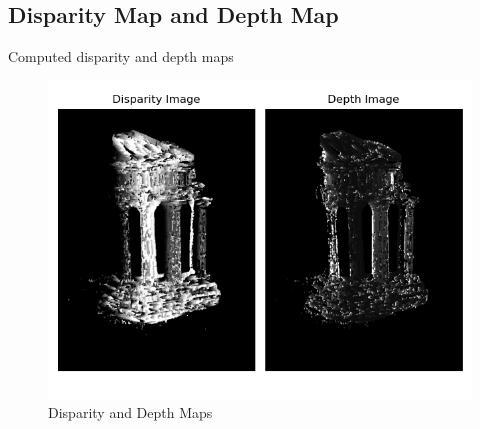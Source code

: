 \subsection{Disparity Map and Depth Map}

\step
Computed disparity and depth maps

\begin{figure}[H]
  \centering
  \includegraphics[width=\textwidth]{./figures/02-disparity+depth.png}
  \caption{Disparity and Depth Maps}  
\end{figure}
